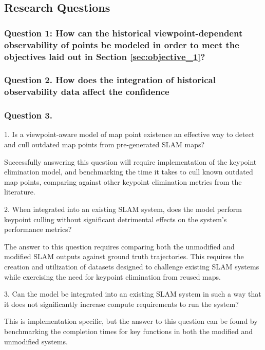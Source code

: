 \subsection{Research Questions}

\subsubsection*{Question 1: How can the historical viewpoint-dependent observability of points be modeled in order to meet the objectives laid out in Section \ref{sec:objective_1}?}

\subsubsection*{Question 2. How does the integration of historical observability data affect the confidence }


\subsubsection*{Question 3. }


1. Is a viewpoint-aware model of map point existence an effective way to detect and cull outdated map points from pre-generated SLAM maps?

Successfully answering this question will require implementation of the keypoint elimination model, and benchmarking the time it takes to cull known outdated map points, comparing against other keypoint elimination metrics from the literature.


2. When integrated into an existing SLAM system, does the model perform keypoint culling without significant detrimental effects on the system's performance metrics?

The answer to this question requires comparing both the unmodified and modified SLAM outputs against ground truth trajectories. This requires the creation and utilization of datasets designed to challenge existing SLAM systems while exercising the need for keypoint elimination from reused maps.


3. Can the model be integrated into an existing SLAM system in such a way that it does not significantly increase compute requirements to run the system?

This is implementation specific, but the answer to this question can be found by benchmarking the completion times for key functions in both the modified and unmodified systems.